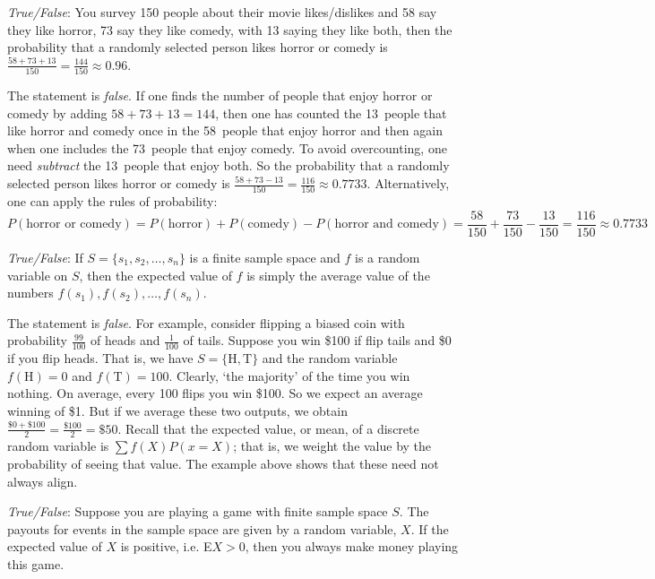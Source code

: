 \documentclass[11pt,letterpaper]{article}
\begin{document}
\quizsol \textit{True/False}: You survey 150 people about their movie likes/dislikes and 58 say they like horror, 73 say they like comedy, with 13 saying they like both, then the probability that a randomly selected person likes horror or comedy is $\frac{58 + 73 + 13}{150}= \frac{144}{150} \approx 0.96$. \pspace

\sol The statement is \textit{false}. If one finds the number of people that enjoy horror or comedy by adding $58 + 73 + 13= 144$, then one has counted the 13~people that like horror and comedy once in the 58~people that enjoy horror and then again when one includes the 73~people that enjoy comedy. To avoid overcounting, one need \textit{subtract} the 13~people that enjoy both. So the probability that a randomly selected person likes horror or comedy is $\frac{58 + 73 - 13}{150}= \frac{116}{150} \approx 0.7733$. Alternatively, one can apply the rules of probability:
	\[
	P(\text{horror or comedy})= P(\text{horror}) + P(\text{comedy}) - P(\text{horror and comedy})= \dfrac{58}{150} + \dfrac{73}{150} - \dfrac{13}{150}= \frac{116}{150} \approx 0.7733
	\] \pvspace{1.3cm}



\quizsol \textit{True/False}: If $S= \{ s_1, s_2, \ldots, s_n \}$ is a finite sample space and $f$ is a random variable on $S$, then the expected value of $f$ is simply the average value of the numbers $f(s_1), f(s_2), \ldots, f(s_n)$. \pspace

\sol The statement is \textit{false}. For example, consider flipping a biased coin with probability $\frac{99}{100}$ of heads and $\frac{1}{100}$ of tails. Suppose you win \$100 if flip tails and \$0 if you flip heads. That is, we have $S= \{ \text{H}, \text{T} \}$ and the random variable $f(\text{H})= 0$ and $f(\text{T})= 100$. Clearly, `the majority' of the time you win nothing. On average, every 100 flips you win \$100. So we expect an average winning of \$1. But if we average these two outputs, we obtain $\frac{\$0 + \$100}{2}= \frac{\$100}{2}= \$50$. Recall that the expected value, or mean, of a discrete random variable is $\sum f(X) P(x= X)$; that is, we weight the value by the probability of seeing that value. The example above shows that these need not always align. \pvspace{1.3cm}



\quizsol \textit{True/False}: Suppose you are playing a game with finite sample space $S$. The payouts for events in the sample space are given by a random variable, $X$. If the expected value of $X$ is positive, i.e. E$X > 0$, then you always make money playing this game. \pspace
\end{document}
